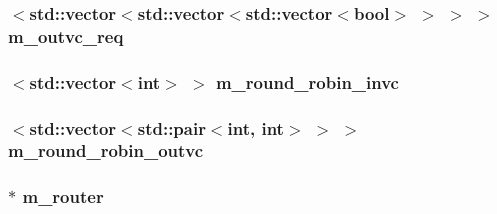 \label{classVCallocator__d_afb9d0344d4f274a64e63a4801587c497}
\hypertarget{classVCallocator__d_a565c44d4e130274c6c0f138f46436556}{
\subsubsection[{m\_\-outvc\_\-req}]{$<${\bf std::vector}$<${\bf std::vector}$<${\bf std::vector}$<$bool$>$ $>$ $>$ $>$ {\bf m\_\-outvc\_\-req}}}
\label{classVCallocator__d_a565c44d4e130274c6c0f138f46436556}
\hypertarget{classVCallocator__d_a831d6cd1f4d45e61a10ab72187b33d5c}{
\subsubsection[{m\_\-round\_\-robin\_\-invc}]{$<${\bf std::vector}$<$int$>$ $>$ {\bf m\_\-round\_\-robin\_\-invc}}}
\label{classVCallocator__d_a831d6cd1f4d45e61a10ab72187b33d5c}
\hypertarget{classVCallocator__d_a3242844a3a1fcc8d060e0fc43684ddb0}{
\subsubsection[{m\_\-round\_\-robin\_\-outvc}]{$<${\bf std::vector}$<${\bf std::pair}$<$int, int$>$ $>$ $>$ {\bf m\_\-round\_\-robin\_\-outvc}}}
\label{classVCallocator__d_a3242844a3a1fcc8d060e0fc43684ddb0}
\hypertarget{classVCallocator__d_a81d53a65b375007289068e764da769d8}{
\subsubsection[{m\_\-router}]{$\ast$ {\bf m\_\-router}}}
